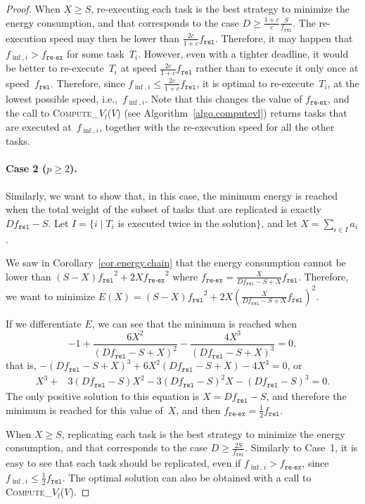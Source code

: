 \documentclass[a4paper]{article}
\theoremstyle{plain}
\theoremstyle{definition}
\theoremstyle{remark}
\newcommand{\finf}{\ensuremath{f_{\inf,i}}\xspace}
\newcommand{\fr}{\ensuremath{f_{\texttt{rel}}}\xspace}
\newcommand{\freex}{\ensuremath{f_{\texttt{re-ex}}}\xspace}
\newcommand{\computeVl}{\textsc{Compute\_}$V_l$}
\begin{document}
\begin{proof}
When $X\geq S$, re-executing each task is the best strategy to
minimize the energy consumption, and that corresponds to the case $D
\geq \frac{1+c}{c}\frac{S}{\fr}$. The re-execution speed may then be
lower than $\frac{2c}{1+c}\fr$. Therefore, it may happen that $\finf >
\freex$ for some task~$T_i$. However, even with a tighter deadline, it
would be better to re-execute~$T_i$ at speed $\frac{2c}{1+c}\fr$
rather than to execute it only once at speed~\fr. Therefore, since
$\finf \leq \frac{2c}{1+c}\fr$, it is optimal to re-execute~$T_i$, at
the lowest possible speed, i.e.,~\finf. Note that this changes the
value of \freex, and the call to \mbox{\computeVl($V$)} (see
Algorithm~\ref{algo.computevl}) returns tasks that are executed
at~\finf, together with the re-execution speed for all the other tasks.



\paragraph{Case 2 ($p\geq 2$). }
Similarly, we want to show that, in this case, the minimum energy is
reached when the total weight of the subset of tasks that are
replicated is exactly $D\fr-S$. Let $I=\{i\; |\; T_i$ is executed
twice in the solution$\}$, and let $X=\sum_{i\in I}a_i$.

We saw in Corollary~\ref{cor.energy.chain} that the energy consumption
cannot be lower than $(S-X)\fr^2 + 2X \freex^2$ where $\freex =
\frac{X}{D\fr-S+X}\fr$.  Therefore, we want to minimize $E(X) =
(S-X)\fr^2 + 2X \left( \frac{X}{D\fr-S+X}\fr \right)^2$.

If we differentiate $E$, we can see that the minimum is reached when 
$$-1 + \frac{6X^2}{(D\fr - S + X)^2} - \frac{4X^3}{(D\fr - S + X)^3} =
0,$$
that 
is, $-(D\fr - S + X)^3 + 6X^2(D\fr - S + X) - 4X^3 = 0$, or 
\begin{align*}
X^3 +& 3(D\fr -S)X^2 - 3(D\fr -S)^2X -(D\fr -S)^3 = 0.
\end{align*}
The only positive solution to this equation is $X = D\fr -S$, and
therefore the minimum is reached for this value of~$X$, and then 
$\freex=\frac{1}{2}\fr$.  

When $X\geq S$, replicating each task is the best strategy to 
minimize the energy consumption, and that corresponds to the case 
$D \geq \frac{2S}{\fr}$. Similarly to Case~1, it is easy to see that
each task should be replicated, even if $\finf>\freex$, since \mbox{$\finf
\leq \frac{1}{2}\fr$.} The optimal solution can also be obtained with a
call to \computeVl($V$). 
\end{proof}
\end{document}
